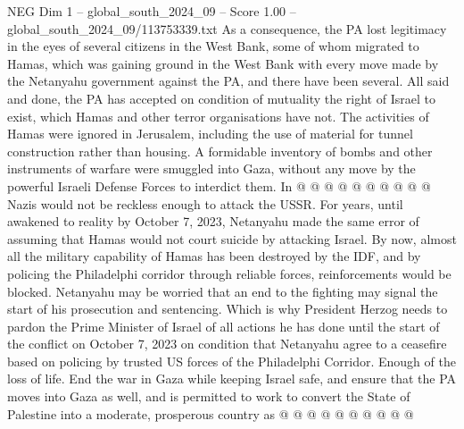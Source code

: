\begin{textsample}{NEG Dim 1 – global\_south\_2024\_09 – Score 1.00 – global\_south\_2024\_09/113753339.txt}
As a consequence, the PA lost legitimacy in the eyes of several citizens in the West Bank, some of whom migrated to Hamas, which was gaining ground in the West Bank with every move made by the Netanyahu government against the PA, and there have been several.
All said and done, the PA has accepted on condition of mutuality the right of Israel to exist, which Hamas and other terror organisations have not.
The activities of Hamas were ignored in Jerusalem, including the use of material for tunnel construction rather than housing.
A formidable inventory of bombs and other instruments of warfare were smuggled into Gaza, without any move by the powerful Israeli Defense Forces to interdict them.
In @ @ @ @ @ @ @ @ @ @ Nazis would not be reckless enough to attack the USSR.
For years, until awakened to reality by October 7, 2023, Netanyahu made the same error of assuming that Hamas would not court suicide by attacking Israel.
By now, almost all the military capability of Hamas has been destroyed by the IDF, and by policing the Philadelphi corridor through reliable forces, reinforcements would be blocked.
Netanyahu may be worried that an end to the fighting may signal the start of his prosecution and sentencing.
Which is why President Herzog needs to pardon the Prime Minister of Israel of all actions he has done until the start of the conflict on October 7, 2023 on condition that Netanyahu agree to a ceasefire based on policing by trusted US forces of the Philadelphi Corridor.
Enough of the loss of life.
End the war in Gaza while keeping Israel safe, and ensure that the PA moves into Gaza as well, and is permitted to work to convert the State of Palestine into a moderate, prosperous country as @ @ @ @ @ @ @ @ @ @

\end{textsample}
